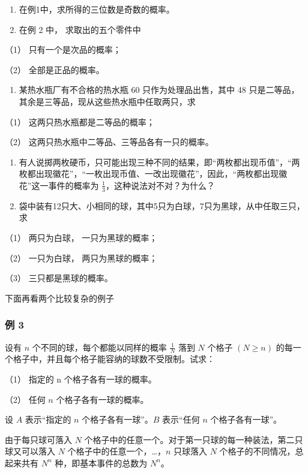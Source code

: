 \begin{enumerate}
\item
  在例1中，求所得的三位数是奇数的概率。
\item
  在例 2 中， 求取出的五个零件中
\end{enumerate}

（1） 只有一个是次品的概率；

（2） 全部是正品的概率。

\begin{enumerate}[start=3]
\item
  某热水瓶厂有不合格的热水瓶 60 只作为处理品出售，其中 48
  只是二等品，其余是三等品，现从这些热水瓶中任取两只，求
\end{enumerate}

（1） 这两只热水瓶都是二等品的概率；

（2） 这两只热水瓶中二等品、三等品各有一只的概率。

\begin{enumerate}[start=4]
\item
  有人说掷两枚硬币，只可能出现三种不同的结果，即``两枚都出现币值''，``两枚都出现徽花''，``一枚出现币值、一改出现徽花''，因此，``两枚都出现徽花''这一事件的概率为
  \(\frac{1}{3}\)，这种说法对不对？为什么？
\item
  袋中装有12只大、小相同的球，其中5只为白球，7只为黑球，从中任取三只，求
\end{enumerate}

（1） 两只为白球， 一只为黑球的概率；

（2） 一只为白球， 两只为黑球的概率；

（3） 三只都是黑球的概率。

下面再看两个比较复杂的例子

\subsubsection{例 3}

设有 \(n\) 个不同的球，每个都能以同样的概率 \(\frac{1}{N}\) 落到 \(N\)
个格子 \((N \geqslant n)\)
的每一个格子中，并且每个格子能容纳的球数不受限制。试求：

（1） 指定的 n 个格子各有一球的概率。

（2） 任何 \(n\) 个格子各有一球的概率。

 设 \(A\) 表示``指定的 \(n\) 个格子各有一球''。\(B\)
表示``任何 \(n\) 个格子各有一球''。

由于每只球可落入 \(N\)
个格子中的任意一个。对于第一只球的每一种装法，第二只球又可以落入 \(N\)
个格子中的任意一个，\ldots，\(n\) 只球落入 \(N\)
个格子的不同情况，总起来共有 \(N^n\) 种，即基本事件的总数为 \(N^n\)。

